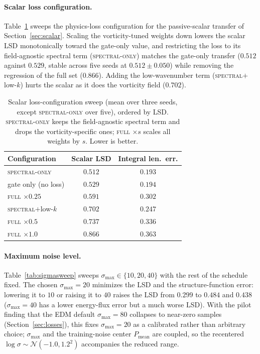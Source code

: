 \documentclass[10pt]{article} %
\begin{document}
\paragraph{Scalar loss configuration.} Table~\ref{tab:scalarloss} sweeps the physics-loss configuration for the passive-scalar transfer of Section~\ref{sec:scalar}. Scaling the vorticity-tuned weights down lowers the scalar LSD monotonically toward the gate-only value, and restricting the loss to its field-agnostic spectral term (\textsc{spectral-only}) matches the gate-only transfer ($0.512$ against $0.529$, stable across five seeds at $0.512 \pm 0.050$) while removing the regression of the full set ($0.866$). Adding the low-wavenumber term (\textsc{spectral}$+$low-$k$) hurts the scalar as it does the vorticity field ($0.702$).

\begin{table}[H]
\centering
\caption{Scalar loss-configuration sweep (mean over three seeds, except \textsc{spectral-only} over five), ordered by LSD. \textsc{spectral-only} keeps the field-agnostic spectral term and drops the vorticity-specific ones; \textsc{full} $\times s$ scales all weights by $s$. Lower is better.}
\label{tab:scalarloss}
\begin{tabular}{lcc}
\toprule
Configuration & Scalar LSD & Integral len.\ err. \\
\midrule
\textsc{spectral-only} & $\mathbf{0.512}$ & $0.193$ \\
gate only (no loss) & $0.529$ & $\mathbf{0.194}$ \\
\textsc{full} $\times 0.25$ & $0.591$ & $0.302$ \\
\textsc{spectral}$+$low-$k$ & $0.702$ & $0.247$ \\
\textsc{full} $\times 0.5$ & $0.737$ & $0.336$ \\
\textsc{full} $\times 1.0$ & $0.866$ & $0.363$ \\
\bottomrule
\end{tabular}
\end{table}

\paragraph{Maximum noise level.} Table~\ref{tab:sigmasweep} sweeps $\sigma_{\max}\in\{10,20,40\}$ with the rest of the schedule fixed. The chosen $\sigma_{\max}=20$ minimizes the LSD and the structure-function error: lowering it to $10$ or raising it to $40$ raises the LSD from $0.299$ to $0.484$ and $0.438$ ($\sigma_{\max}=40$ has a lower energy-flux error but a much worse LSD). With the pilot finding that the EDM default $\sigma_{\max}=80$ collapses to near-zero samples (Section~\ref{sec:losses}), this fixes $\sigma_{\max}=20$ as a calibrated rather than arbitrary choice; $\sigma_{\max}$ and the training-noise center $P_{\text{mean}}$ are coupled, so the recentered $\log\sigma\sim\mathcal{N}(-1.0,1.2^2)$ accompanies the reduced range.
\end{document}
